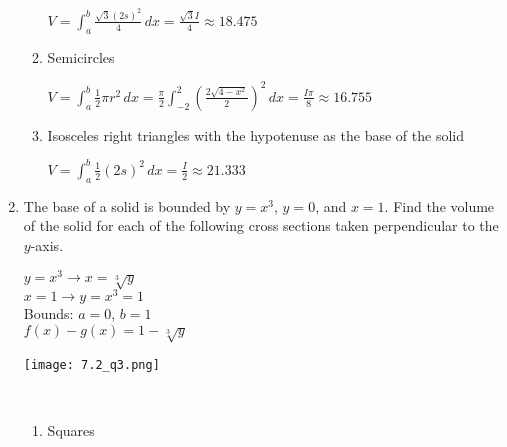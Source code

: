 \documentclass[10pt,letterpaper]{report}
\begin{document}
\begin{enumerate}
\begin{enumerate}
      $V=\int_{a}^{b}{\frac{\sqrt{3}(2s)^{2}}{4}}\,dx=\frac{\sqrt{3}I}{4}\approx 18.475$ \\
      
    \item{Semicircles \\} 
    
      $V=\int_{a}^{b}{\frac{1}{2}\pi r^{2}}\,dx=\frac{\pi}{2}\int_{-2}^{2}{\left(\frac{2\sqrt{4-x^{2}}}{2}\right)^{2}}\,dx=\frac{I\pi}{8}\approx 16.755$ \\
      
    \item{Isosceles right triangles with the hypotenuse as the base of the solid \\}
    
      $V=\int_{a}^{b}{\frac{1}{2}(2s)^{2}}\,dx=\frac{I}{2}\approx 21.333$ \\
      
  \end{enumerate}
  
  \pagebreak
  
  \item{The base of a solid is bounded by $y=x^{3}$, $y=0$, and $x=1$. Find the volume of the solid for each of the following cross sections taken perpendicular to the $y$-axis. \\}
  \begin{multicols}{2}
  
    $y=x^{3}\rightarrow x=\sqrt[3]{y}$ \\
    
    $x=1\rightarrow y=x^{3}=1$ \\
    
    Bounds: $a=0$, $b=1$ \\
    
    $f(x)-g(x)=1-\sqrt[3]{y}$ \\
    
    \vfill\null
    
    \columnbreak
    
    \begin{center}
      \texttt{[image: 7.2\_q3.png]} \\
    \end{center} \\
    \columnbreak
  \end{multicols}
  \begin{enumerate}
    \item{Squares \\}
    

\end{enumerate}
\end{enumerate}
\end{document}
